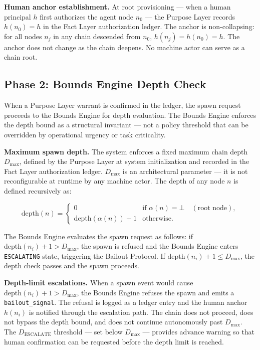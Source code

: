 \medskip
\noindent\textbf{Human anchor establishment.} At root provisioning — when a human principal $h$ first authorizes the agent node $n_0$ — the Purpose Layer records $h(n_0) = h$ in the Fact Layer authorization ledger. The anchor is non-collapsing: for all nodes $n_j$ in any chain descended from $n_0$, $h(n_j) = h(n_0) = h$. The anchor does not change as the chain deepens. No machine actor can serve as a chain root.

\subsection{Phase 2: Bounds Engine Depth Check}

When a Purpose Layer warrant is confirmed in the ledger, the spawn request proceeds to the Bounds Engine for depth evaluation. The Bounds Engine enforces the depth bound as a structural invariant — not a policy threshold that can be overridden by operational urgency or task criticality.

\medskip
\noindent\textbf{Maximum spawn depth.} The system enforces a fixed maximum chain depth $D_{\max}$, defined by the Purpose Layer at system initialization and recorded in the Fact Layer authorization ledger. $D_{\max}$ is an architectural parameter — it is not reconfigurable at runtime by any machine actor. The depth of any node $n$ is defined recursively as:

\begin{equation}
\text{depth}(n) =
\begin{cases}
0 & \text{if } \alpha(n) = \bot \quad (\text{root node}),\\[4pt]
\text{depth}(\alpha(n)) + 1 & \text{otherwise}.
\end{cases}
\label{eq:rs-depth-def}
\end{equation}

The Bounds Engine evaluates the spawn request as follows: if $\text{depth}(n_i) + 1 > D_{\max}$, the spawn is refused and the Bounds Engine enters \texttt{ESCALATING} state, triggering the Bailout Protocol. If $\text{depth}(n_i) + 1 \leq D_{\max}$, the depth check passes and the spawn proceeds.

\medskip
\noindent\textbf{Depth-limit escalations.} When a spawn event would cause $\text{depth}(n_i) + 1 > D_{\max}$, the Bounds Engine refuses the spawn and emits a \texttt{bailout\_signal}. The refusal is logged as a ledger entry and the human anchor $h(n_i)$ is notified through the escalation path. The chain does not proceed, does not bypass the depth bound, and does not continue autonomously past $D_{\max}$. The $D_{\text{ESCALATE}}$ threshold — set below $D_{\max}$ — provides advance warning so that human confirmation can be requested before the depth limit is reached.

